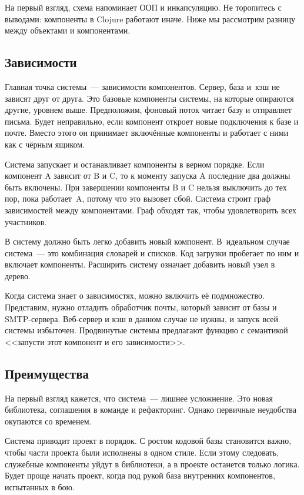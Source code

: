На первый взгляд, схема напоминает ООП и инкапсуляцию. Не торопитесь с выводами:
компоненты в Clojure работают иначе. Ниже мы рассмотрим разницу между объектами
и компонентами.

\subsection{Зависимости}

Главная точка системы~--- зависимости компонентов. Сервер, база и~кэш не зависят
друг от друга. Это базовые компоненты системы, на которые опираются другие,
уровнем выше. Предположим, фоновый поток читает базу и отправляет письма. Будет
неправильно, если компонент откроет новые подключения к базе и почте. Вместо
этого он принимает включённые компоненты и работает с ними как с чёрным ящиком.

Система запускает и останавливает компоненты в верном порядке. Если компонент A
зависит от B и C, то к моменту запуска A последние два должны быть включены. При
завершении компоненты B и C нельзя выключить до тех пор, пока работает~A, потому
что это вызовет сбой. Система строит граф зависимостей между компонентами. Граф
обходят так, чтобы удовлетворить всех участников.

В систему должно быть легко добавить новый компонент. В~идеальном случае
система~--- это комбинация словарей и списков. Код загрузки пробегает по ним и
включает компоненты. Расширить систему означает добавить новый узел в дерево.

Когда система знает о зависимостях, можно включить её подмножество. Представим,
нужно отладить обработчик почты, который зависит от базы и
SMTP-сервера. Веб-сервер и кэш в данном случае не нужны, и запуск всей системы
избыточен. Продвинутые системы предлагают функцию с семантикой <<запусти этот
компонент и его зависимости>>.

\subsection{Преимущества}

На первый взгляд кажется, что система~--- лишнее усложнение. Это новая
библиотека, соглашения в команде и рефакторинг. Однако первичные неудобства
окупаются со временем.

Система приводит проект в порядок. С ростом кодовой базы становится важно, чтобы
части проекта были исполнены в одном стиле. Если этому следовать, служебные
компоненты уйдут в библиотеки, а в проекте останется только логика. Будет проще
начать проект, когда под рукой база внутренних компонентов, испытанных в бою.

